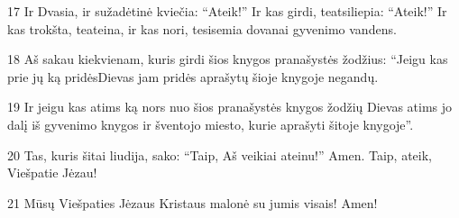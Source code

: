 \par 17 Ir Dvasia, ir sužadėtinė kviečia: “Ateik!” Ir kas girdi, teatsiliepia: “Ateik!” Ir kas trokšta, teateina, ir kas nori, tesisemia dovanai gyvenimo vandens. 
\par 18 Aš sakau kiekvienam, kuris girdi šios knygos pranašystės žodžius: “Jeigu kas prie jų ką pridės­Dievas jam pridės aprašytų šioje knygoje negandų. 
\par 19 Ir jeigu kas atims ką nors nuo šios pranašystės knygos žodžių­ Dievas atims jo dalį iš gyvenimo knygos ir šventojo miesto, kurie aprašyti šitoje knygoje”. 
\par 20 Tas, kuris šitai liudija, sako: “Taip, Aš veikiai ateinu!” Amen. Taip, ateik, Viešpatie Jėzau! 
\par 21 Mūsų Viešpaties Jėzaus Kristaus malonė su jumis visais! Amen!



